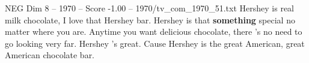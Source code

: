 \begin{textsample}{NEG Dim 8 – 1970 – Score -1.00 – 1970/tv\_com\_1970\_51.txt}  \label{ex:f8_neg_012}
Hershey is real milk chocolate, I love that Hershey bar.
Hershey is that \textbf{something} special no matter where you are.
Anytime you want delicious chocolate, there 's no need to go looking very far.
Hershey 's great.
Cause Hershey is the great American, great American chocolate bar.

\end{textsample}

